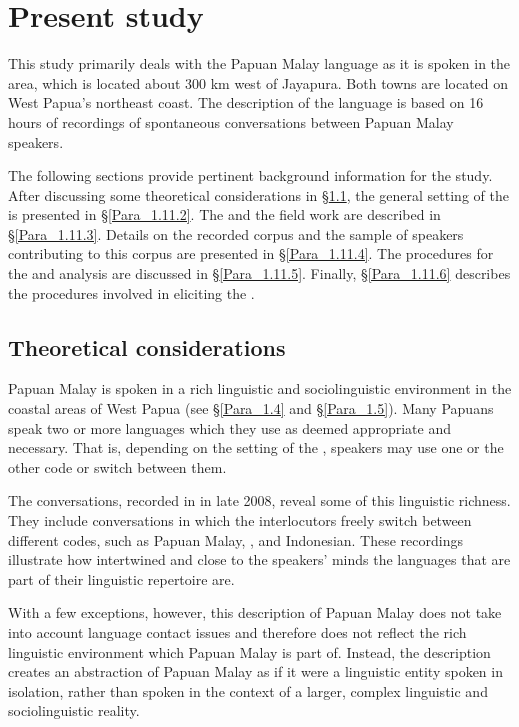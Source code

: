 {\section{Present study}\label{Para_1.11}
This study primarily deals with the Papuan Malay language as it is spoken in the  area, which is located about 300 km west of Jayapura. Both towns are located on West Papua’s northeast coast. The description of the language is based on 16 hours of recordings of spontaneous conversations between Papuan Malay speakers.



The following sections provide pertinent background information for the study. After discussing some theoretical considerations in §\ref{Para_1.11.1}, the general setting of the   is presented in §\ref{Para_1.11.2}. The  and the field work are described in §\ref{Para_1.11.3}. Details on the recorded corpus and the sample of speakers contributing to this corpus are presented in §\ref{Para_1.11.4}. The procedures for the  and analysis are discussed in §\ref{Para_1.11.5}. Finally, §\ref{Para_1.11.6} describes the procedures involved in eliciting the .


\subsection{Theoretical considerations}\label{Para_1.11.1}
Papuan Malay is spoken in a rich linguistic and sociolinguistic environment in the coastal areas of West Papua (see §\ref{Para_1.4} and §\ref{Para_1.5}). Many Papuans speak two or more languages which they use as deemed appropriate and necessary. That is, depending on the setting of the , speakers may use one or the other code or switch between them.



The conversations, recorded in  in late 2008, reveal some of this linguistic richness. They include conversations in which the interlocutors freely switch between different codes, such as Papuan Malay, , and Indonesian. These recordings illustrate how intertwined and close to the speakers’ minds the languages that are part of their linguistic repertoire are.



With a few exceptions, however, this description of Papuan Malay does not take into account language contact issues and therefore does not reflect the rich linguistic environment which Papuan Malay is part of. Instead, the description creates an abstraction of Papuan Malay as if it were a linguistic entity spoken in isolation, rather than spoken in the context of a larger, complex linguistic and sociolinguistic reality.



}
